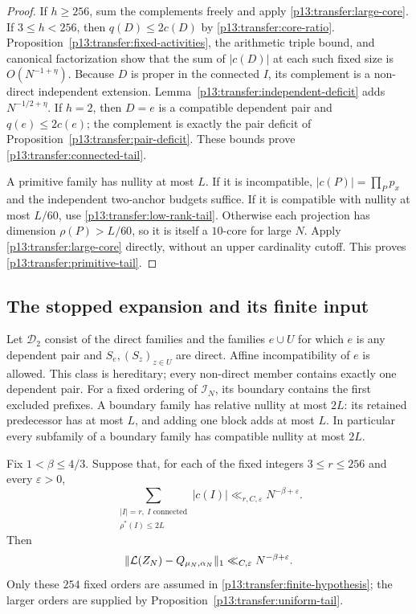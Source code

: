\begin{proof}
If $h\geq256$, sum the complements freely and apply
\eqref{p13:transfer:large-core}. If $3\leq h<256$, then
$q(D)\leq2c(D)$ by \eqref{p13:transfer:core-ratio}.
Proposition~\ref{p13:transfer:fixed-activities}, the arithmetic triple
bound, and canonical factorization show that the sum of $|c(D)|$ at
each such fixed size is $O(N^{-1+\eta})$. Because $D$ is proper in
the connected $I$, its complement is a non-direct independent extension.
Lemma~\ref{p13:transfer:independent-deficit} adds $N^{-1/2+\eta}$.
If $h=2$, then $D=e$ is a compatible dependent pair and $q(e)\leq2c(e)$;
the complement is exactly the pair deficit of
Proposition~\ref{p13:transfer:pair-deficit}. These bounds prove
\eqref{p13:transfer:connected-tail}.

A primitive family has nullity at most $L$. If it is incompatible,
$|c(P)|=\prod_Pp_x$ and the independent two-anchor budgets suffice.
If it is compatible with nullity at most $L/60$, use
\eqref{p13:transfer:low-rank-tail}. Otherwise each projection has
dimension $\rho(P)>L/60$, so it is itself a $10$-core for large $N$.
Apply \eqref{p13:transfer:large-core} directly, without an upper
cardinality cutoff. This proves \eqref{p13:transfer:primitive-tail}.
\end{proof}

\subsection{The stopped expansion and its finite input}

Let $\mathscr D_2$ consist of the direct families and the families
$e\cup U$ for which $e$ is any dependent pair and $S_e,(S_z)_{z\in U}$
are direct. Affine incompatibility of $e$ is allowed. This class is
hereditary; every non-direct member contains exactly one dependent pair.
For a fixed ordering of $\mathcal I_N$, its boundary contains the first
excluded prefixes. A boundary family has relative nullity at most $2L$:
its retained predecessor has at most $L$, and adding one block adds
at most $L$. In particular every subfamily of a boundary family has
compatible nullity at most $2L$.

\begin{theorem}
\label{p13:transfer:finite}
Fix $1<\beta\leq4/3$. Suppose that, for each of the fixed integers
$3\leq r\leq256$ and every $\varepsilon>0$,
\begin{equation}
 \sum_{\substack{|I|=r,\ I\text{ connected}\\\rho^*(I)\leq2L}}
                   |c(I)|\ll_{r,C,\varepsilon}N^{-\beta+\varepsilon}.
 \label{p13:transfer:finite-hypothesis}
\end{equation}
Then
\begin{equation}
 \|\mathcal L(Z_N)-Q_{\mu_N,\alpha_N}\|_1
                  \ll_{C,\varepsilon}N^{-\beta+\varepsilon}.
 \label{p13:transfer:finite-conclusion}
\end{equation}
Only these $254$ fixed orders are assumed in
\eqref{p13:transfer:finite-hypothesis}; the larger orders are supplied
by Proposition~\ref{p13:transfer:uniform-tail}.
\end{theorem}

